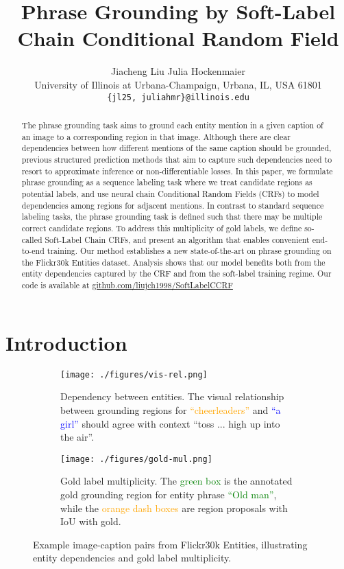 \documentclass[11pt,a4paper]{article}
\title{Phrase Grounding by Soft-Label Chain Conditional Random Field}
\author{
Jiacheng Liu  Julia Hockenmaier \\
University of Illinois at Urbana-Champaign, Urbana, IL, USA 61801 \\
{\tt \{jl25, juliahmr\}@illinois.edu}
}
\date{}
\begin{document}
\maketitle
\begin{abstract}
The phrase grounding task aims to ground each entity mention in a given caption of an image to a corresponding region in that image. Although there are clear dependencies between how different mentions of the same caption should be grounded, previous structured prediction methods that aim to capture such dependencies need to resort to approximate inference or non-differentiable losses. In this paper, we formulate phrase grounding as a sequence labeling task where we treat candidate regions as potential labels, and use neural chain Conditional Random Fields (CRFs) to model dependencies among regions for adjacent mentions. In contrast to standard sequence labeling tasks, the phrase grounding task is defined such that there may be multiple correct candidate regions. To address this multiplicity of gold labels, we define so-called Soft-Label Chain CRFs, and present an algorithm that enables convenient end-to-end training. Our method establishes a new state-of-the-art on phrase grounding on the Flickr30k Entities dataset. Analysis shows that our model benefits both from the entity dependencies captured by the CRF and from the soft-label training regime. Our code is available at \url{github.com/liujch1998/SoftLabelCCRF}
\end{abstract}

\section{Introduction}
\label{sec:introduction}

\begin{figure}[t]
    \centering
    \begin{subfigure}[b]{0.48 \columnwidth}
        \texttt{[image: ./figures/vis-rel.png]}
        \caption{Dependency between entities. The visual relationship between grounding regions for \textcolor{orange}{``cheerleaders''} and \textcolor{blue}{``a girl''} should agree with context ``toss ... high up into the air''. }
        \label{fig:vis-rel}
    \end{subfigure}
    \begin{subfigure}[b]{0.48 \columnwidth}
        \texttt{[image: ./figures/gold-mul.png]}
        \caption{Gold label multiplicity. The \textcolor{green}{green box} is the annotated gold grounding region for entity phrase \textcolor{green}{``Old man''}, while the \textcolor{orange}{orange dash boxes} are region proposals with IoU  with gold. }
        \label{fig:gold-mul}
    \end{subfigure}
    \caption{Example image-caption pairs from Flickr30k Entities, illustrating entity dependencies and gold label multiplicity. }
\end{figure}
\end{document}
